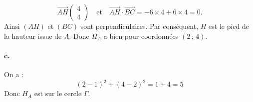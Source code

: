 \[
\overrightarrow{AH} \begin{pmatrix} 4 \\ 4 \end{pmatrix} \quad \text{et} \quad \overrightarrow{AH} \cdot \overrightarrow{BC} = -6 \times 4 + 6 \times 4 = 0.
\]
Ainsi \( (AH) \) et \( (BC) \) sont perpendiculaires.  
Par conséquent, \( H \) est le pied de la hauteur issue de \( A \).  
Donc \( H_A \) a bien pour coordonnées \( (2\,;\,4) \).

\paragraph{c.} On a :
\[
(2 - 1)^2 + (4 - 2)^2 = 1 + 4 = 5
\]
Donc \( H_A \) est sur le cercle \( \Gamma \).
